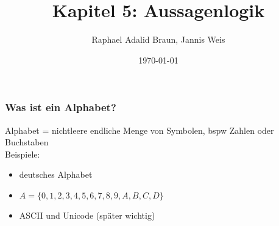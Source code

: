 \documentclass{beamer}
\title{Kapitel 5: Aussagenlogik}
\author{Raphael Adalid Braun, Jannis Weis}
\date{\today}
\institute{KIT - Karlruher Institut für Technologie}
\begin{document}
	\begin{frame}
		\frametitle{Was ist ein Alphabet?}
		Alphabet = nichtleere endliche Menge von Symbolen, bspw Zahlen oder Buchstaben\\
		Beispiele:
		\begin{itemize}
			\item deutsches Alphabet
			\item $A = \{0, 1, 2, 3, 4, 5, 6, 7, 8, 9, A, B, C, D\}$
			\item ASCII und Unicode (später wichtig)
		\end{itemize}
	\end{frame}
\end{document}

